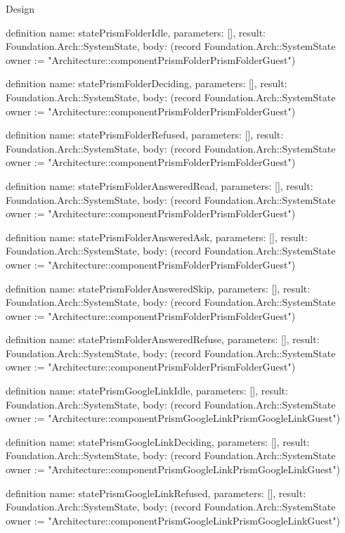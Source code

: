 \begin{lexlean}{Design}
\begin{semanticmodule}
definition{
  name: statePrismFolderIdle,
  parameters: [],
  result: Foundation.Arch::SystemState,
  body: (record Foundation.Arch::SystemState {owner := "Architecture::componentPrismFolderPrismFolderGuest"})
}

definition{
  name: statePrismFolderDeciding,
  parameters: [],
  result: Foundation.Arch::SystemState,
  body: (record Foundation.Arch::SystemState {owner := "Architecture::componentPrismFolderPrismFolderGuest"})
}

definition{
  name: statePrismFolderRefused,
  parameters: [],
  result: Foundation.Arch::SystemState,
  body: (record Foundation.Arch::SystemState {owner := "Architecture::componentPrismFolderPrismFolderGuest"})
}

definition{
  name: statePrismFolderAnsweredRead,
  parameters: [],
  result: Foundation.Arch::SystemState,
  body: (record Foundation.Arch::SystemState {owner := "Architecture::componentPrismFolderPrismFolderGuest"})
}

definition{
  name: statePrismFolderAnsweredAsk,
  parameters: [],
  result: Foundation.Arch::SystemState,
  body: (record Foundation.Arch::SystemState {owner := "Architecture::componentPrismFolderPrismFolderGuest"})
}

definition{
  name: statePrismFolderAnsweredSkip,
  parameters: [],
  result: Foundation.Arch::SystemState,
  body: (record Foundation.Arch::SystemState {owner := "Architecture::componentPrismFolderPrismFolderGuest"})
}

definition{
  name: statePrismFolderAnsweredRefuse,
  parameters: [],
  result: Foundation.Arch::SystemState,
  body: (record Foundation.Arch::SystemState {owner := "Architecture::componentPrismFolderPrismFolderGuest"})
}

definition{
  name: statePrismGoogleLinkIdle,
  parameters: [],
  result: Foundation.Arch::SystemState,
  body: (record Foundation.Arch::SystemState {owner := "Architecture::componentPrismGoogleLinkPrismGoogleLinkGuest"})
}

definition{
  name: statePrismGoogleLinkDeciding,
  parameters: [],
  result: Foundation.Arch::SystemState,
  body: (record Foundation.Arch::SystemState {owner := "Architecture::componentPrismGoogleLinkPrismGoogleLinkGuest"})
}

definition{
  name: statePrismGoogleLinkRefused,
  parameters: [],
  result: Foundation.Arch::SystemState,
  body: (record Foundation.Arch::SystemState {owner := "Architecture::componentPrismGoogleLinkPrismGoogleLinkGuest"})
}


\end{semanticmodule}
\end{lexlean}
